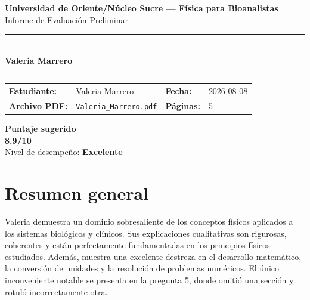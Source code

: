 \documentclass[11pt,a4paper]{article}
\begin{document}
\begin{center}
  {\Large\bfseries\color{azulTitulo} Universidad de Oriente/Núcleo Sucre --- Física para Bioanalistas}\\[4pt]
  {\large Informe de Evaluación Preliminar}\\[12pt]
  \rule{\linewidth}{1.2pt}\\[6pt]
  {\LARGE\bfseries Valeria Marrero}\\[4pt]
  \rule{\linewidth}{0.6pt}
\end{center}

\vspace{4pt}
\begin{tcolorbox}[cajaTitulo, title=Datos del informe]
\begin{tabular}{@{}llll@{}}
  \textbf{Estudiante:}  & Valeria Marrero  &
  \textbf{Fecha:}       & 2026-08-08 \\[4pt]
  \textbf{Archivo PDF:} & \texttt{Valeria\_Marrero.pdf}  &
  \textbf{Páginas:}     & 5 \\
\end{tabular}
\end{tcolorbox}

\vspace{6pt}
\begin{center}
  \begin{tcolorbox}[
    enhanced,
    colback=white, colframe=desempeno_excelente,
    width=0.62\linewidth,
    boxrule=2pt,
    halign=center, valign=center,
    top=8pt, bottom=8pt,
  ]
    \centering
    {\large\bfseries Puntaje sugerido}\\[6pt]
    {\Huge\bfseries\color{desempeno_excelente} 8.9/10}\\[6pt]
    {\large Nivel de desempeño: \textbf{\color{desempeno_excelente} Excelente}}
  \end{tcolorbox}
\end{center}

\section*{Resumen general}
Valeria demuestra un dominio sobresaliente de los conceptos físicos aplicados a los sistemas biológicos y clínicos. Sus explicaciones cualitativas son rigurosas, coherentes y están perfectamente fundamentadas en los principios físicos estudiados. Además, muestra una excelente destreza en el desarrollo matemático, la conversión de unidades y la resolución de problemas numéricos. El único inconveniente notable se presenta en la pregunta 5, donde omitió una sección y rotuló incorrectamente otra.
\end{document}
